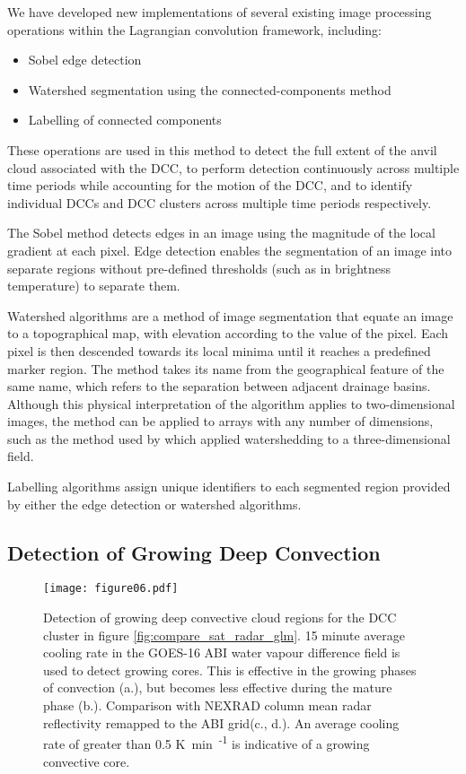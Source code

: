 We have developed new implementations of several existing image processing operations within the Lagrangian convolution framework, including:
\begin{itemize}
    \item Sobel edge detection \citep{sobel_isotropic_2014}
    \item Watershed segmentation using the connected-components method \citep{bieniek_efficient_2000}
    \item Labelling of connected components \citep{hoshen_percolation_1976}
\end{itemize}

These operations are used in this method to detect the full extent of the anvil cloud associated with the DCC, to perform detection continuously across multiple time periods while accounting for the motion of the DCC, and to identify individual DCCs and DCC clusters across multiple time periods respectively.

The Sobel method detects edges in an image using the magnitude of the local gradient at each pixel.
Edge detection enables the segmentation of an image into separate regions without pre-defined thresholds (such as in brightness temperature) to separate them.

Watershed algorithms are a method of image segmentation that equate an image to a topographical map, with elevation according to the value of the pixel.
Each pixel is then descended towards its local minima until it reaches a predefined marker region.
The method takes its name from the geographical feature of the same name, which refers to the separation between adjacent drainage basins.
Although this physical interpretation of the algorithm applies to two-dimensional images, the method can be applied to arrays with any number of dimensions, such as the method used by \citet{fiolleau_algorithm_2013} which applied watershedding to a three-dimensional field.

Labelling algorithms assign unique identifiers to each segmented region provided by either the edge detection or watershed algorithms.

\subsection{Detection of Growing Deep Convection}

\begin{figure*}[t]
    \texttt{[image: figure06.pdf]}
    \caption{Detection of growing deep convective cloud regions for the DCC cluster in figure \ref{fig:compare_sat_radar_glm}. 15 minute average cooling rate in the GOES-16 ABI water vapour difference field is used to detect growing cores. This is effective in the growing phases of convection (a.), but becomes less effective during the mature phase (b.). Comparison with NEXRAD column mean radar reflectivity remapped to the ABI grid(c., d.). An average cooling rate of greater than 0.5 \unit{K min\textsuperscript{-1}} is indicative of a growing convective core.}
    \label{fig:core_detection}
\end{figure*}

